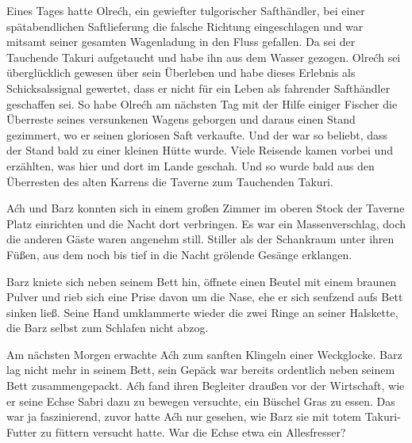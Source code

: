 Eines Tages hatte Olrećh, ein gewiefter tulgorischer Safthändler, bei einer spätabendlichen Saftlieferung die falsche Richtung eingeschlagen und war mitsamt seiner gesamten Wagenladung in den Fluss gefallen. Da sei der Tauchende Takuri aufgetaucht und habe ihn aus dem Wasser gezogen. Olrećh sei überglücklich gewesen über sein Überleben und habe dieses Erlebnis als Schicksalssignal gewertet, dass er nicht für ein Leben als fahrender Safthändler geschaffen sei. So habe Olrećh am nächsten Tag mit der Hilfe einiger Fischer die Überreste seines versunkenen Wagens geborgen und daraus einen Stand gezimmert, wo er seinen gloriosen Saft verkaufte. Und der war so beliebt, dass der Stand bald zu einer kleinen Hütte wurde. Viele Reisende kamen vorbei und erzählten, was hier und dort im Lande geschah. Und so wurde bald aus den Überresten des alten Karrens die Taverne zum Tauchenden Takuri.



\trennzeichen



Aćh und Barz konnten sich in einem großen Zimmer im oberen Stock der Taverne Platz einrichten und die Nacht dort verbringen. Es war ein Massenverschlag, doch die anderen Gäste waren angenehm still. Stiller als der Schankraum unter ihren Füßen, aus dem noch bis tief in die Nacht grölende Gesänge erklangen.


Barz kniete sich neben seinem Bett hin, öffnete einen Beutel mit einem braunen Pulver und rieb sich eine Prise davon um die Nase, ehe er sich seufzend aufs Bett sinken ließ. Seine Hand umklammerte wieder die zwei Ringe an seiner Halskette, die Barz selbst zum Schlafen nicht abzog.

Am nächsten Morgen erwachte Aćh zum sanften Klingeln einer Weckglocke. Barz lag nicht mehr in seinem Bett, sein Gepäck war bereits ordentlich neben seinem Bett zusammengepackt. Aćh fand ihren Begleiter draußen vor der Wirtschaft, wie er seine Echse Sabri dazu zu bewegen versuchte, ein Büschel Gras zu essen. Das war ja faszinierend, zuvor hatte Aćh nur gesehen, wie Barz sie mit totem Takuri-Futter zu füttern versucht hatte. War die Echse etwa ein Allesfresser?

